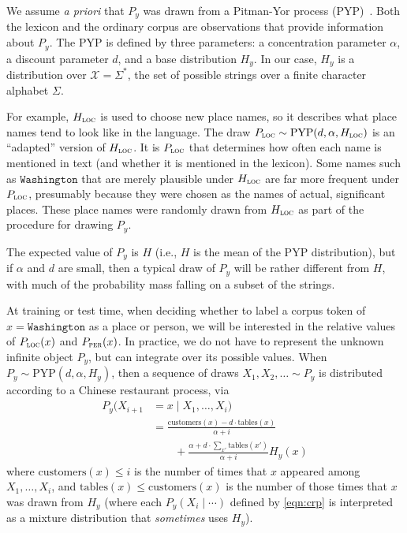 \documentclass[11pt]{article}
\begin{document}
We assume {\em a priori} that $P_y$ was drawn from a Pitman-Yor process (PYP)~\cite{pitman1997two}. Both the lexicon and the ordinary corpus are observations that provide information about $P_y$. The PYP is defined by three parameters: a concentration parameter $\alpha$, a discount parameter $d$, and a base distribution $H_y$. In our case, $H_y$ is a distribution over $\mathcal{X} = \Sigma^*$, the set of possible strings over a finite character alphabet $\Sigma$.

For example, $H_{\textsc{loc}}$ is used to choose new place names, so
it describes what place names tend to look like in the language.  The
draw $P_{\textsc{loc}} \sim \mathrm{PYP}(d,\alpha,H_{\textsc{loc}})$
is an ``adapted'' version of $H_{\textsc{loc}}$.  It is
$P_{\textsc{loc}}$ that determines how often each name is mentioned in
text (and whether it is mentioned in the lexicon).  Some names such as
$\texttt{Washington}$ that are merely plausible under
$H_{\textsc{loc}}$ are far more frequent under $P_{\textsc{loc}}$,
presumably because they were chosen as the names of actual,
significant places.  These place names were randomly drawn from
$H_{\textsc{loc}}$ as part of the procedure for drawing $P_y$.

The expected value of $P_y$ is $H$ (i.e., $H$ is the mean of the PYP
distribution), but if $\alpha$ and $d$ are small, then a typical draw
of $P_y$ will be rather different from $H$, with much of the
probability mass falling on a subset of the strings.

At training or test time, when deciding whether to label a corpus token of $x=\texttt{Washington}$ as a place or person,
we will be interested in the relative values of $P_{\textsc{loc}}(x)$ and $P_{\textsc{per}}(x)$.  In practice, we do not have to represent the unknown infinite object $P_y$,
but can integrate over its possible values.
When $P_y \sim \mathrm{PYP}(d,\alpha,H_y)$, then
a sequence of draws $X_1,X_2,\ldots \sim P_y$ is distributed according to a Chinese restaurant process,
via
\begin{align}
P_y(X_{i+1}&=x \mid X_1,\ldots,X_i) \label{eqn:crp} \\
  & = \frac{\mathrm{customers}(x) - d\cdot \mathrm{tables}(x)}{\alpha + i} \nonumber \\
  & \qquad +  \frac{\alpha + d \cdot \sum_{x'} \mathrm{tables}(x')}{\alpha + i} H_y(x) \nonumber
\end{align}
where $\mathrm{customers}(x) \leq i$
is the number of times that $x$ appeared among $X_1,\ldots,X_i$, and $\mathrm{tables}(x) \leq \mathrm{customers}(x)$ is the number of those times that $x$ was drawn from $H_y$ (where each $P_y(X_i \mid \cdots)$ defined by \eqref{eqn:crp} is interpreted as a mixture distribution that {\em sometimes} uses $H_y$).
\end{document}
